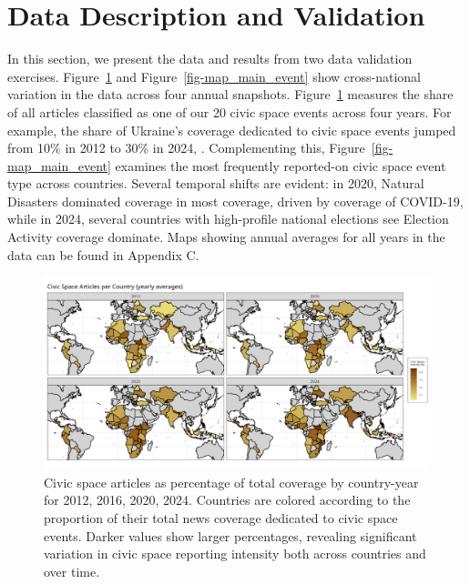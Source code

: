 \documentclass[
  letterpaper,
  DIV=11,
  numbers=noendperiod]{scrartcl}
\begin{document}
\hypertarget{sec-validation}{%
\section{Data Description and Validation}\label{sec-validation}}

In this section, we present the data and results from two data
validation exercises. Figure~\ref{fig-map_cs_p_main} and
Figure~\ref{fig-map_main_event} show cross-national variation in the
data across four annual snapshots. Figure~\ref{fig-map_cs_p_main}
measures the share of all articles classified as one of our 20 civic
space events across four years. For example, the share of Ukraine's
coverage dedicated to civic space events jumped from 10\% in 2012 to
30\% in 2024, . Complementing this, Figure~\ref{fig-map_main_event}
examines the most frequently reported-on civic space event type across
countries. Several temporal shifts are evident: in 2020, Natural
Disasters dominated coverage in most coverage, driven by coverage of
COVID-19, while in 2024, several countries with high-profile national
elections see Election Activity coverage dominate. Maps showing annual
averages for all years in the data can be found in Appendix C.

\begin{figure}

{\centering \includegraphics{descriptive_maps/figures/civic_space_percentage_paper.png}

}

\caption{\label{fig-map_cs_p_main}Civic space articles as percentage of
total coverage by country-year for 2012, 2016, 2020, 2024. Countries are
colored according to the proportion of their total news coverage
dedicated to civic space events. Darker values show larger percentages,
revealing significant variation in civic space reporting intensity both
across countries and over time.}

\end{figure}
\end{document}
